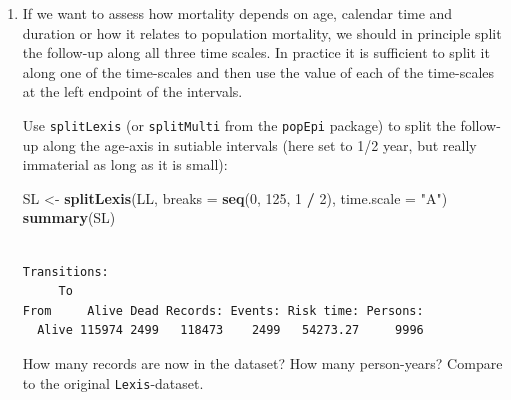 \documentclass[
]{book}
\newenvironment{Shaded}{\begin{snugshade}}{\end{snugshade}}
\newcommand{\AttributeTok}[1]{\textcolor[rgb]{0.13,0.29,0.53}{#1}}
\newcommand{\CommentTok}[1]{\textcolor[rgb]{0.56,0.35,0.01}{\textit{#1}}}
\newcommand{\DecValTok}[1]{\textcolor[rgb]{0.00,0.00,0.81}{#1}}
\newcommand{\FunctionTok}[1]{\textcolor[rgb]{0.13,0.29,0.53}{\textbf{#1}}}
\newcommand{\NormalTok}[1]{#1}
\newcommand{\OtherTok}[1]{\textcolor[rgb]{0.56,0.35,0.01}{#1}}
\newcommand{\SpecialCharTok}[1]{\textcolor[rgb]{0.81,0.36,0.00}{\textbf{#1}}}
\newcommand{\StringTok}[1]{\textcolor[rgb]{0.31,0.60,0.02}{#1}}
\begin{document}
\begin{enumerate}
\begin{verbatim}
 --------------------------------- 
 sex           D        Y    rate  
 --------------------------------- 
 M       1343.00 27614.21   48.63  
 F       1156.00 26659.05   43.36  

 Total   2499.00 54273.27   46.04  
 --------------------------------- 
\end{verbatim}

\begin{Shaded}
\begin{Highlighting}[]
\CommentTok{\# stat.table is more versatile than xtabs:}
\FunctionTok{xtabs}\NormalTok{(}\FunctionTok{cbind}\NormalTok{(}\AttributeTok{D =}\NormalTok{ lex.Xst }\SpecialCharTok{==} \StringTok{"Dead"}\NormalTok{,}
            \AttributeTok{Y =}\NormalTok{ lex.dur) }
      \SpecialCharTok{\textasciitilde{}}\NormalTok{ sex, }
      \AttributeTok{data =}\NormalTok{ LL)}
\end{Highlighting}
\end{Shaded}

\begin{verbatim}

sex        D        Y
  M  1343.00 27614.21
  F  1156.00 26659.05
\end{verbatim}
\item
  If we want to assess how mortality depends on age, calendar time
  and duration or how it relates to population mortality, we should
  in principle split the follow-up along all
  three time scales. In practice it is sufficient to split it along
  one of the time-scales and then use the value of each of the
  time-scales at the left endpoint of the intervals.

  Use \texttt{splitLexis} (or \texttt{splitMulti} from the
  \texttt{popEpi} package) to split the follow-up along the
  age-axis in sutiable intervals (here set to 1/2 year, but really
  immaterial as long as it is small):

\begin{Shaded}
\begin{Highlighting}[]
\NormalTok{SL }\OtherTok{\textless{}{-}} \FunctionTok{splitLexis}\NormalTok{(LL, }
                 \AttributeTok{breaks =} \FunctionTok{seq}\NormalTok{(}\DecValTok{0}\NormalTok{, }\DecValTok{125}\NormalTok{, }\DecValTok{1} \SpecialCharTok{/} \DecValTok{2}\NormalTok{), }
             \AttributeTok{time.scale =} \StringTok{"A"}\NormalTok{)}
\FunctionTok{summary}\NormalTok{(SL)}
\end{Highlighting}
\end{Shaded}

\begin{verbatim}

Transitions:
     To
From     Alive Dead Records: Events: Risk time: Persons:
  Alive 115974 2499   118473    2499   54273.27     9996
\end{verbatim}

  How many records are now in the dataset? How many person-years?
  Compare to the original \texttt{Lexis}-dataset.
\end{enumerate}
\end{document}
